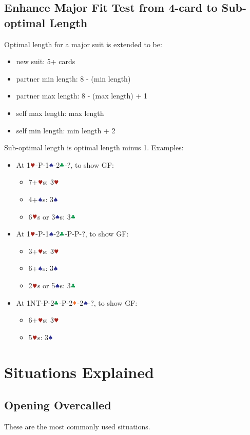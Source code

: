 \documentclass{article}
\begin{document}
\begin{multicols}{2}
\subsection{Enhance Major Fit Test from 4-card to Sub-optimal Length}
Optimal length for a major suit is extended to be:
\begin{itemize}
    \item new suit: 5+ cards
    \item partner min length: 8 - (min length)
    \item partner max length: 8 - (max length) + 1
    \item self max length: max length
    \item self min length: min length + 2
\end{itemize}
Sub-optimal length is optimal length minus 1. Examples:
\begin{itemize}
    \item At 1$\hhh$-P-1$\sss$-2$\ccc$-?, to show GF:
    \begin{itemize}
        \item 7+$\hhh$s: 3$\hhh$
        \item 4+$\sss$s: 3$\sss$
        \item 6$\hhh$s or 3$\sss$s: 3$\ccc$
    \end{itemize}
    \item At 1$\hhh$-P-1$\sss$-2$\ccc$-P-P-?, to show GF:
    \begin{itemize}
        \item 3+$\hhh$s: 3$\hhh$
        \item 6+$\sss$s: 3$\sss$
        \item 2$\hhh$s or 5$\sss$s: 3$\ccc$
    \end{itemize}
    \item At 1NT-P-2$\ccc$-P-2$\ddd$-2$\sss$-?, to show GF:
    \begin{itemize}
        \item 6+$\hhh$s: 3$\hhh$
        \item 5$\hhh$s: 3$\sss$
    \end{itemize}
\end{itemize}

\section{Situations Explained}
\subsection{Opening Overcalled}
These are the most commonly used situations.

\end{multicols}
\end{document}
